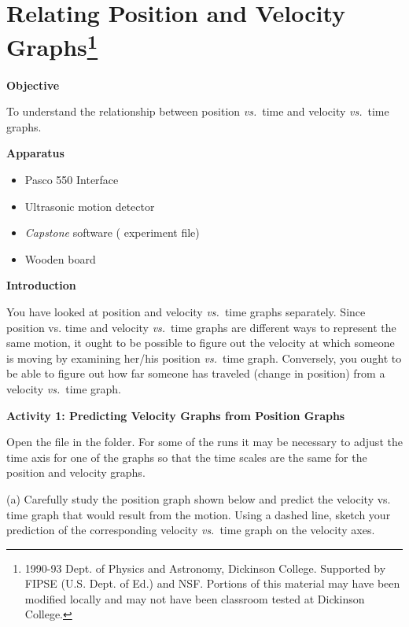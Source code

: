 
\section{Relating Position and Velocity Graphs\footnote{
1990-93 Dept. of Physics and Astronomy, Dickinson College. Supported by FIPSE
(U.S. Dept. of Ed.) and NSF. Portions of this material may have been modified
locally and may not have been classroom tested at Dickinson College.
}}

\makelabheader %

\medskip
\textbf{Objective }

To understand the relationship between position \textit{vs.}~time and velocity \textit{vs.}~time
graphs.

\medskip

\textbf{Apparatus} 

\begin{itemize}[nosep]
\item Pasco 550 Interface
\item Ultrasonic motion detector 
\item \textit{Capstone} software ( experiment file)
\item Wooden board
\end{itemize}

\medskip
\textbf{Introduction} 

You have looked at position and velocity \textit{vs.}~time graphs separately. Since position
vs. time and velocity \textit{vs.}~time graphs are different ways to represent the same
motion, it ought to be possible to figure out the velocity at which someone
is moving by examining her/his position \textit{vs.}~time graph. Conversely, you ought
to be able to figure out how far someone has traveled (change in position) from
a velocity \textit{vs.}~time graph.


\medskip

\textbf{Activity 1: Predicting Velocity Graphs from Position Graphs} 

Open the file  in the \filename{\coursefolder} folder.
For some of the runs it may be necessary to adjust the time axis for one of the graphs so that the time scales are the same for the position and velocity graphs.

(a) Carefully study the position graph shown below and predict the velocity
vs. time graph that would result from the motion. Using a dashed line, sketch
your prediction of the corresponding velocity \textit{vs.}~time graph on the velocity
axes.

